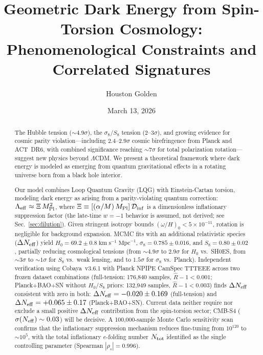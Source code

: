 \documentclass[aps,prd,twocolumn,superscriptaddress,showpacs,preprintnumbers,nofootinbib,longbibliography,floatfix]{revtex4-2}
\newcommand{\Leff}{\Lambda_{\rm eff}}
\newcommand{\Dinf}{\mathcal{D}_{\rm inf}}
\newcommand{\MPl}{M_{\rm Pl}}
\newcommand{\Neff}{N_{\rm eff}}
\begin{document}

\title{Geometric Dark Energy from Spin-Torsion Cosmology:\\
Phenomenological Constraints and Correlated Signatures}

\author{Houston Golden}

\date{March 13, 2026}

\begin{abstract}
The Hubble tension (${\sim}4.9\sigma$), the $\sigma_8$/$S_8$ tension ($2$--$3\sigma$), and growing evidence for cosmic parity violation---including $2.4$--$2.9\sigma$ cosmic birefringence from Planck and ACT~DR6, with combined significance reaching ${\sim}7\sigma$ for total polarization rotation---suggest new physics beyond $\Lambda$CDM. We present a theoretical framework where dark energy is modeled as emerging from quantum gravitational effects in a rotating universe born from a black hole interior.

Our model combines Loop Quantum Gravity (LQG) with Einstein-Cartan torsion, modeling dark energy as arising from a parity-violating quantum correction: $\Leff \approx \Xi\,\MPl^2$, where $\Xi \equiv [(\alpha/M)\,\MPl]\,\Dinf$ is a dimensionless inflationary suppression factor (the late-time $w=-1$ behavior is assumed, not derived; see Sec.~\ref{sec:dilution}). Given stringent isotropy bounds $(\omega/H)_0 < 5 \times 10^{-11}$, rotation is negligible for background expansion. MCMC fits with an additional relativistic species ($\Delta\Neff$) yield $H_0 = 69.2 \pm 0.8\;\text{km}\;\text{s}^{-1}\;\text{Mpc}^{-1}$, $\sigma_8 = 0.785 \pm 0.016$, and $S_8 = 0.80 \pm 0.02$, partially reducing cosmological tensions (from ${\sim}4.9\sigma$ to $2.9\sigma$ for $H_0$ vs.\ SH0ES, from ${\sim}3\sigma$ to ${\sim}1\sigma$ for $S_8$ vs.\ weak lensing, and to $1.5\sigma$ for $\sigma_8$ vs.\ Planck). Independent verification using Cobaya~v3.6.1 with Planck NPIPE CamSpec TTTEEE across two frozen dataset combinations (full-tension: 176{,}840 samples, $\hat{R}-1 < 0.001$; Planck+BAO+SN without $H_0$/$S_8$ priors: 132{,}949 samples, $\hat{R}-1 < 0.003$) finds $\Delta\Neff$ consistent with zero in both: $\Delta\Neff = -0.020 \pm 0.169$ (full-tension) and $\Delta\Neff = +0.065 \pm 0.17$ (Planck+BAO+SN). Current data neither require nor exclude a small positive $\Delta\Neff$ contribution from the spin-torsion sector; CMB-S4 ($\sigma(\Neff) \sim 0.03$) will be decisive. A 100{,}000-sample Monte Carlo sensitivity scan confirms that the inflationary suppression mechanism reduces fine-tuning from $10^{120}$ to $\sim 10^5$, with the total inflationary $e$-folding number $N_{\rm tot}$ identified as the single controlling parameter (Spearman $|\rho_s| = 0.996$).


\end{abstract}
\end{document}
